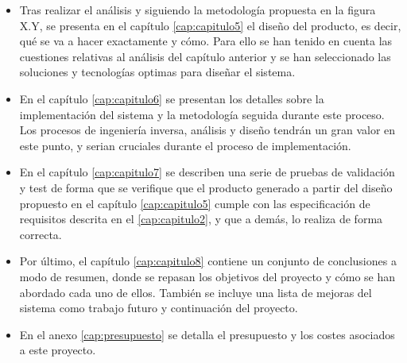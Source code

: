 \begin{itemize}
    \item Tras realizar el análisis y siguiendo la metodología propuesta en la figura X.Y, se presenta en el capítulo \ref{cap:capitulo5} el diseño del producto, es decir, qué se va a hacer exactamente y cómo. Para ello se han tenido en cuenta las cuestiones relativas al análisis del capítulo anterior y se han seleccionado las soluciones y tecnologías optimas para diseñar el sistema.

    \item En el capítulo \ref{cap:capitulo6} se presentan los detalles sobre la implementación del sistema y la metodología seguida durante este proceso. Los procesos de ingeniería inversa, análisis y diseño tendrán un gran valor en este punto, y serian cruciales durante el proceso de implementación.

    \item En el capítulo \ref{cap:capitulo7} se describen una serie de pruebas de validación y test de forma que se verifique que el producto generado a partir del diseño propuesto en el capítulo \ref{cap:capitulo5} cumple con las especificación de requisitos descrita en el \ref{cap:capitulo2}, y que a demás, lo realiza de forma correcta.

    \item Por último, el capítulo \ref{cap:capitulo8} contiene un conjunto de conclusiones a modo de resumen, donde se repasan los objetivos del proyecto y cómo se han abordado cada uno de ellos. También se incluye una lista de mejoras del sistema como trabajo futuro y continuación del proyecto.

    \item En el anexo \ref{cap:presupuesto} se detalla el presupuesto y los costes asociados a este proyecto.
\end{itemize}

